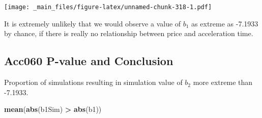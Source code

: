 \documentclass[]{book}
\newenvironment{Shaded}{\begin{snugshade}}{\end{snugshade}}
\newcommand{\KeywordTok}[1]{\textcolor[rgb]{0.13,0.29,0.53}{\textbf{#1}}}
\newcommand{\DataTypeTok}[1]{\textcolor[rgb]{0.13,0.29,0.53}{#1}}
\newcommand{\DecValTok}[1]{\textcolor[rgb]{0.00,0.00,0.81}{#1}}
\newcommand{\StringTok}[1]{\textcolor[rgb]{0.31,0.60,0.02}{#1}}
\newcommand{\OperatorTok}[1]{\textcolor[rgb]{0.81,0.36,0.00}{\textbf{#1}}}
\newcommand{\NormalTok}[1]{#1}
\begin{document}
\begin{Shaded}
\end{Shaded}

\texttt{[image: \_main\_files/figure-latex/unnamed-chunk-318-1.pdf]}

It is extremely unlikely that we would observe a value of \(b_1\) as
extreme as -7.1933 by chance, if there is really no relationship between
price and acceleration time.

\subsection{Acc060 P-value and
Conclusion}\label{acc060-p-value-and-conclusion}

Proportion of simulations resulting in simulation value of \(b_2\) more
extreme than -7.1933.

\begin{Shaded}
\begin{Highlighting}[]
\KeywordTok{mean}\NormalTok{(}\KeywordTok{abs}\NormalTok{(b1Sim) }\OperatorTok{>}\StringTok{ }\KeywordTok{abs}\NormalTok{(b1))}
\end{Highlighting}
\end{Shaded}
\end{document}

